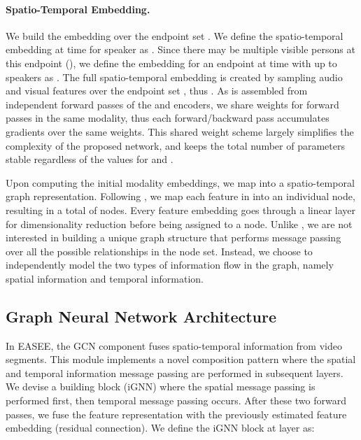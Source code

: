 \documentclass[10pt,twocolumn,letterpaper]{article}
\begin{document}
\paragraph{Spatio-Temporal Embedding.} We build the embedding  over the endpoint set . We define the spatio-temporal embedding  at time  for speaker  as . Since there may be multiple visible persons at this endpoint (\ie ), we define the embedding for an endpoint at time  with up to  speakers  as . The full spatio-temporal embedding  is created by sampling audio and visual features over the endpoint set , thus . As  is assembled from independent forward passes of the  and  encoders, we share weights for forward passes in the same modality, thus each forward/backward pass accumulates gradients over the same weights. This shared weight scheme largely simplifies the complexity of the proposed network, and keeps the total number of parameters stable regardless of the values for  and .

Upon computing the initial modality embeddings, we map  into a spatio-temporal graph representation. Following \cite{leon2021maas}, we map each feature in  into an individual node, resulting in a total of  nodes. Every feature embedding goes through a linear layer for dimensionality reduction before being assigned to a node. Unlike \cite{leon2021maas}, we are not interested in building a unique graph structure that performs message passing over all the possible relationships in the node set. Instead, we choose to independently model the two types of information flow in the graph, namely spatial information and temporal information.


\subsection{Graph Neural Network Architecture}
In EASEE, the GCN component fuses spatio-temporal information from video segments. This module implements a novel composition pattern where the spatial and temporal information message passing are performed in subsequent layers. We devise a building block (iGNN) where the spatial message passing is performed first, then temporal message passing occurs. After these two forward passes, we fuse the feature representation with the previously estimated feature embedding (residual connection). We define the iGNN block at layer  as: 

\vspace{-0.3cm}

\vspace{-0.6cm}
\end{document}
